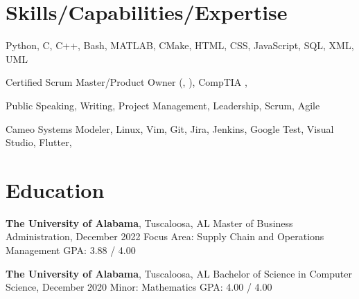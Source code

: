 \documentclass[hidelinks, 11pt]{article}
\begin{document}
\makecvtitle
\vspace{0.5mm}

\section{Skills/Capabilities/Expertise}

\begin{description}[widest=Programming Langauges:]
	\item[Programming Languages\normalfont:] Python, C, C++, Bash, MATLAB, CMake, HTML, CSS, JavaScript, SQL, XML, UML
	\item[Certifications\normalfont:] Certified Scrum Master/Product Owner (, ), CompTIA , 
	\item[Soft Skills\normalfont:] Public Speaking, Writing, Project Management, Leadership, Scrum, Agile
	\item[Tools\normalfont:] Cameo Systems Modeler, Linux, Vim, Git, Jira, Jenkins, Google Test, Visual Studio, Flutter, 
\end{description}

\section{Education}
\begin{multicols}{2}
	\begin{minipage}{0.5\textwidth}
		\textbf{The University of Alabama}, Tuscaloosa, AL \newline
		Master of Business Administration, December 2022 \newline
		Focus Area: Supply Chain and Operations Management \newline
		GPA: 3.88 / 4.00
	\end{minipage}
	\begin{minipage}{0.5\textwidth}
		\textbf{The University of Alabama}, Tuscaloosa, AL \newline
		Bachelor of Science in Computer Science, December 2020 \newline
		Minor: Mathematics \newline
		GPA: 4.00 / 4.00
	\end{minipage}
\end{multicols}
\end{document}
